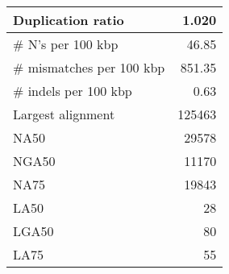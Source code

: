 \documentclass[12pt,a4paper]{article}
\begin{document}
\begin{table}[ht]
\begin{center}
\begin{tabular}{|l*{1}{|r}|}
Duplication ratio & 1.020 \\ \hline
\# N's per 100 kbp & 46.85 \\ \hline
\# mismatches per 100 kbp & 851.35 \\ \hline
\# indels per 100 kbp & 0.63 \\ \hline
Largest alignment & 125463 \\ \hline
NA50 & 29578 \\ \hline
NGA50 & 11170 \\ \hline
NA75 & 19843 \\ \hline
LA50 & 28 \\ \hline
LGA50 & 80 \\ \hline
LA75 & 55 \\ \hline
\end{tabular}
\end{center}
\end{table}
\end{document}

